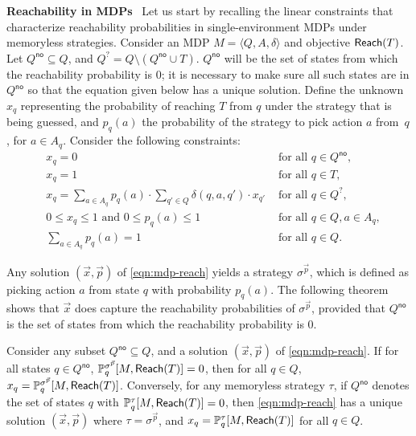 \documentclass[a4paper,USenglish,cleveref, autoref, thm-restate]{lipics-v2021}
\def\myparagraph#1{\noindent\textbf{#1}~}
\newcommand{\tuple}[1]{\langle #1 \rangle}
\newcommand*{\pr}{\mathbb{P}}
\newcommand\Reach{\textrm{\sf Reach}}
\begin{document}
\smallskip
\myparagraph{Reachability in MDPs}
\def\Qno{Q^{\textsf{no}}}
\def\Qquestion{Q^{?}}
Let us start by recalling the linear constraints that characterize 
reachability probabilities in single-environment MDPs under memoryless strategies.
Consider an MDP $M=\tuple{Q,A,\delta}$ and objective $\Reach(T)$.
Let $\Qno \subseteq Q$, and $\Qquestion = Q\setminus (\Qno \cup T)$.
$\Qno$ will be the set of states from which the reachability probability is $0$; it is necessary to make sure all such states are in $\Qno$ 
so that the equation given below has a unique solution.
Define the unknown $x_q$ representing the probability of reaching $T$ from $q$ under the strategy that is being guessed,
and $p_{q}(a)$ the probability of the strategy to pick action $a$ from~$q$, for $a \in A_q$.
Consider the following constraints:
\begin{equation}
  \label{eqn:mdp-reach}
  \!\!\!\!\begin{array}{lll}
    &x_q = 0 & \text{ for all } q \in \Qno, \\
    &x_q = 1 & \text{ for all } q\in T, \\   
    &x_q = \sum_{a \in A_q} p_{q}(a) \cdot \sum_{q' \in Q} \delta(q,a,q') \cdot x_{q'} & \text{ for all } q \in \Qquestion,\\
    &0 \leq x_q \leq 1 \text{ and } 0 \leq p_{q}(a) \leq 1 & \text{ for all } q \in Q, a \in A_q,\\
    &\sum_{a \in A_q} p_{q}(a) =1 & \text{ for all } q \in Q.
  \end{array}
\end{equation}

Any solution $(\vec{x}, \vec{p})$ of \eqref{eqn:mdp-reach} yields a strategy $\sigma^{\vec{p}}$, 
which is defined as picking action $a$ from state $q$ with probability $p_{q}(a)$. 
The following theorem shows that $\vec{x}$ does capture the reachability probabilities
of $\sigma^{\vec{p}}$, provided that $\Qno$ is the set of states from which 
the reachability probability is $0$. 

\begin{theorem}
  \label{thm:mdp-reach-charact}
  Consider any subset $\Qno \subseteq Q$, and a solution $(\vec{x}, \vec{p})$ of \eqref{eqn:mdp-reach}.
  If for all states $q \in \Qno$, $\pr^{\sigma^{\vec{p}}}_q[M, \Reach(T)] = 0$,
  then for all $q\in Q$, $x_q = \pr^{\sigma^{\vec{p}}}_q[M, \Reach(T)]$.
  Conversely, for any memoryless strategy $\tau$, if $\Qno$ denotes the set 
  of states $q$ with $\pr^{\tau}_q[M, \Reach(T)] = 0$, then 
  \eqref{eqn:mdp-reach} has a unique solution $(\vec{x}, \vec{p})$ where $\tau = \sigma^{\vec{p}}$,
  and $x_q = \pr^{\tau}_q[M, \Reach(T)]$ for all $q \in Q$.
\end{theorem}
\end{document}
